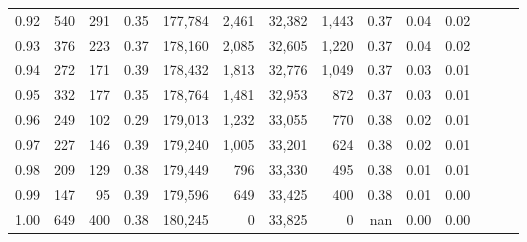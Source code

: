 \begin{tabular}{rrrrrrrrrrrrrr}
0.92 &    540 &  291 &  0.35 &  177,784 &    2,461 &  32,382 &   1,443 &  0.37 &  0.04 &      0.02 \\
0.93 &    376 &  223 &  0.37 &  178,160 &    2,085 &  32,605 &   1,220 &  0.37 &  0.04 &      0.02 \\
0.94 &    272 &  171 &  0.39 &  178,432 &    1,813 &  32,776 &   1,049 &  0.37 &  0.03 &      0.01 \\
0.95 &    332 &  177 &  0.35 &  178,764 &    1,481 &  32,953 &     872 &  0.37 &  0.03 &      0.01 \\
0.96 &    249 &  102 &  0.29 &  179,013 &    1,232 &  33,055 &     770 &  0.38 &  0.02 &      0.01 \\
0.97 &    227 &  146 &  0.39 &  179,240 &    1,005 &  33,201 &     624 &  0.38 &  0.02 &      0.01 \\
0.98 &    209 &  129 &  0.38 &  179,449 &      796 &  33,330 &     495 &  0.38 &  0.01 &      0.01 \\
0.99 &    147 &   95 &  0.39 &  179,596 &      649 &  33,425 &     400 &  0.38 &  0.01 &      0.00 \\
1.00 &    649 &  400 &  0.38 &  180,245 &        0 &  33,825 &       0 &   nan &  0.00 &      0.00 \\
\bottomrule
\end{tabular}
